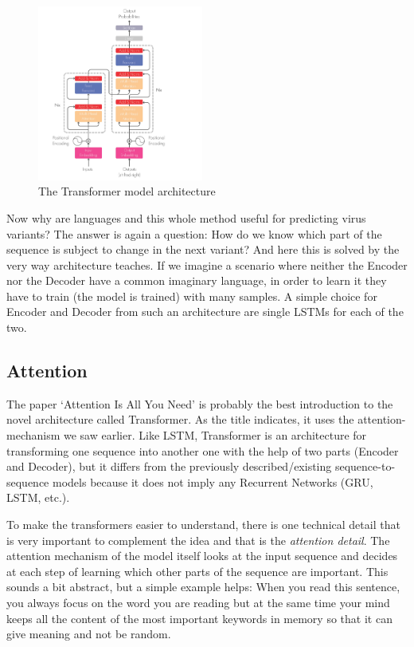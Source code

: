 \documentclass[conference,compsoc]{IEEEtran}
\begin{document}
\begin{figure}[h]
    \centering
    \includegraphics[width=0.485\textwidth]{images/fig8-architecture.jpg}
    \caption{The Transformer model architecture \cite{ref24}}
    \label{fig8}
\end{figure}

Now why are languages and this whole method useful for predicting virus variants? The answer is again a question: How do we know which part of the sequence is subject to change in the next variant?
And here this is solved by the very way architecture teaches. If we imagine a scenario where neither the Encoder nor the Decoder have a common imaginary language, in order to learn it they have to train (the model is trained) with many samples. A simple choice for Encoder and Decoder from such an architecture are single LSTMs for each of the two. 

\subsection{Attention}

The paper ‘Attention Is All You Need’ \cite{ref24} is probably the best introduction to the novel architecture called Transformer. As the title indicates, it uses the attention-mechanism we saw earlier. Like LSTM, Transformer is an architecture for transforming one sequence into another one with the help of two parts (Encoder and Decoder), but it differs from the previously described/existing sequence-to-sequence models because it does not imply any Recurrent Networks (GRU, LSTM, etc.).

To make the transformers easier to understand, there is one technical detail that is very important to complement the idea and that is the \textit{attention detail}.
The attention mechanism of the model itself looks at the input sequence and decides at each step of learning which other parts of the sequence are important. This sounds a bit abstract, but a simple example helps:
When you read this sentence, you always focus on the word you are reading but at the same time your mind keeps all the content of the most important keywords in memory so that it can give meaning and not be random.
\end{document}
